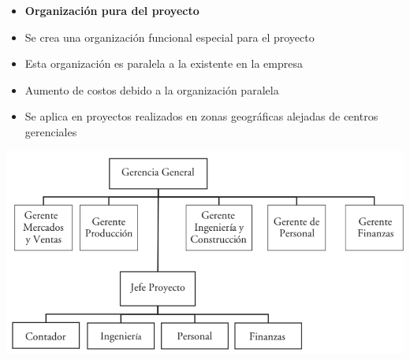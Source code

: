 \documentclass{article} %
\begin{document}
\begin{minipage}{0.45\textwidth}
    \begin{itemize}
        \item \textbf{Organización pura del proyecto}
        \item Se crea una organización funcional especial para el proyecto
        \item Esta organización es paralela a la existente en la empresa
        \item Aumento de costos debido a la organización paralela
        \item Se aplica en proyectos realizados en zonas geográficas alejadas de centros gerenciales
    \end{itemize}
\end{minipage}
\hfill
\begin{minipage}{0.5\textwidth}
    \centering
    \includegraphics[width=1.2\textwidth]{arbol_org_gen.png}
\end{minipage}
\end{document}
